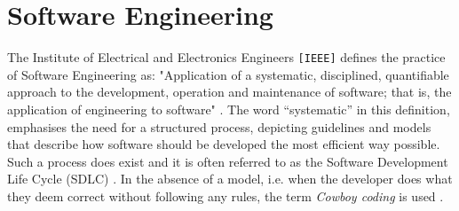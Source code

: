 \chapter{Software Engineering}
The Institute of Electrical and Electronics Engineers \texttt{[IEEE]} defines the practice of Software Engineering as: "Application of a systematic, disciplined, quantifiable approach to the development, operation and maintenance of software; that is, the application of engineering to software" \cite[p.~421]{8016712}. The word ``systematic'' in this definition, emphasises the need for a structured process, depicting guidelines and models that describe how software should be developed the most efficient way possible. Such a process does exist and it is often referred to as the Software Development Life Cycle (SDLC) \cite[p.~420]{8016712}. In the absence of a model, i.e. when the developer does what they deem correct without following any rules, the term \emph{Cowboy coding} is used \cite[p.~34]{landry2011iterative}.


